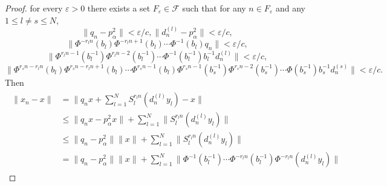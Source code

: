 \documentclass[10pt,a4paper]{amsart}
\begin{document}
\begin{proof}
for every $\varepsilon>0$ there exists a set $F_{\varepsilon}\in\mathcal{F}$ such that for any $n\in F_{\varepsilon}$ and any $1\leq l\neq s \leq N$,
\[\|q_{n}-p^{2}_{\alpha}\|<\varepsilon/c, \|d^{(l)}_{n}-p^{2}_{\alpha}\|<\varepsilon/c,\]
\[\|\Phi^{-r_{l}n}(b_{l})\Phi^{-r_{l}n+1}(b_{l})\cdots \Phi^{-1}(b_{l})q_{n}\|<\varepsilon/c,\]
\[\|\Phi^{r_{l}n-1}(b^{-1}_{l})\Phi^{r_{l}n-2}(b^{-1}_{l})\cdots\Phi^{-1}(b^{-1}_{l})b^{-1}_{l}d^{(l)}_{n}\|<\varepsilon/c,\]
\[\|\Phi^{r_{s}n-r_{l}n}(b_{l})\Phi^{r_{s}n-r_{l}n+1}(b_{l})\cdots\Phi^{r_{s}n-1}(b_{l})\Phi^{r_{s}n-1}(b^{-1}_{s})\Phi^{r_{s}n-2}(b^{-1}_{s})\cdots \Phi(b^{-1}_{s})b^{-1}_{s}d^{(s)}_{n}\|<\varepsilon/c.\]
Then 
\begin{eqnarray}\begin{split}\nonumber
\|x_{n}-x\|&=\|q_{n}x+\sum^{N}_{l=1}S^{r_{l}n}_{l}(d^{(l)}_{n}y_{l})-x\|
\\
&\leq \|q_{n}x-p^{2}_{\alpha}x\|+\sum^{N}_{l=1}\|S^{r_{l}n}_{l}(d^{(l)}_{n}y_{l})\|
\\
&\leq\|q_{n}-p^{2}_{\alpha}\|\|x\|+\sum^{N}_{l=1}\|S^{r_{l}n}_{l}(d^{(l)}_{n}y_{l})\|
\\
&=\|q_{n}-p^{2}_{\alpha}\|\|x\|+\sum^{N}_{l=1}\|\Phi^{-1} (b^{-1}_{l})\cdots \Phi^{-r_{l}n} (b^{-1}_{l})\Phi^{-r_{l}n} (d^{(l)}_{n}y_{l})\|
\end{split}
\end{eqnarray}


\end{proof}
\end{document}
